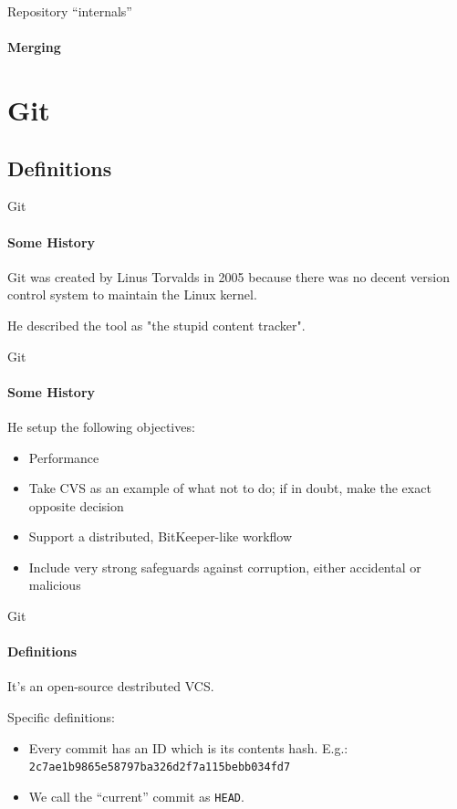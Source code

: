 \documentclass{beamer}
\begin{document}
\begin{frame}{Repository ``internals''}
\framesubtitle{Merging}%
\begin{figure}
	\centering
\end{figure}
\end{frame}

\section{Git}

\subsection{Definitions}
\begin{frame}{Git}
\framesubtitle{Some History}
Git was created by Linus Torvalds in 2005 because there was no decent version control system to maintain the Linux kernel.

He described the tool as "the stupid content tracker".
\end{frame}

\begin{frame}{Git}
\framesubtitle{Some History}
He setup the following objectives:
\begin{itemize}
	\item Performance
	\item Take CVS as an example of what not to do; if in doubt, make the exact opposite decision
	\item Support a distributed, BitKeeper-like workflow
	\item Include very strong safeguards against corruption, either accidental or malicious
\end{itemize}
\end{frame}

\begin{frame}{Git}
\framesubtitle{Definitions}

It's an open-source destributed VCS.

Specific definitions:
\begin{itemize}
	\item Every commit has an ID which is its contents hash. E.g.: \texttt{2c7ae1b9865e58797ba326d2f7a115bebb034fd7}
	\item We call the ``current'' commit as \alert{\texttt{HEAD}}.
\end{itemize}

\end{frame}
\end{document}
